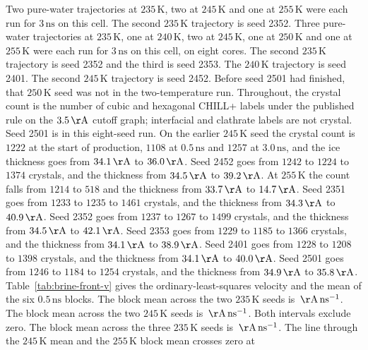 Two pure-water trajectories at $235\,\mathrm{K}$, two at
$245\,\mathrm{K}$ and one at $255\,\mathrm{K}$ were each run for
$3\,\mathrm{ns}$ on this cell.
The second $235\,\mathrm{K}$ trajectory is seed 2352.
Three pure-water trajectories at $235\,\mathrm{K}$, one at
$240\,\mathrm{K}$, two at $245\,\mathrm{K}$, one at
$250\,\mathrm{K}$ and one at $255\,\mathrm{K}$ were each run for
$3\,\mathrm{ns}$ on this cell, on eight cores.
The second $235\,\mathrm{K}$ trajectory is seed 2352 and the
third is seed 2353.
The $240\,\mathrm{K}$ trajectory is seed 2401.
The second $245\,\mathrm{K}$ trajectory is seed 2452.
Before seed 2501 had finished, that $250\,\mathrm{K}$ seed was not
in the two-temperature run.
Throughout, the crystal count is the number of cubic and hexagonal
CHILL+ labels under the published rule on the
$3.5\,\mathrm{\AA}$ cutoff graph; interfacial and clathrate labels are
not crystal.
Seed 2501 is in this eight-seed run.
On the earlier $245\,\mathrm{K}$ seed the crystal count is $1222$
at the start of production, $1108$ at $0.5\,\mathrm{ns}$ and $1257$
at $3.0\,\mathrm{ns}$, and the ice thickness goes from
$34.1\,\mathrm{\AA}$ to $36.0\,\mathrm{\AA}$.
Seed 2452 goes from $1242$ to $1224$ to $1374$ crystals, and the
thickness from $34.5\,\mathrm{\AA}$ to $39.2\,\mathrm{\AA}$.
At $255\,\mathrm{K}$ the count falls from $1214$ to $518$ and the
thickness from $33.7\,\mathrm{\AA}$ to $14.7\,\mathrm{\AA}$.
Seed 2351 goes from $1233$ to $1235$ to $1461$ crystals, and the
thickness from $34.3\,\mathrm{\AA}$ to $40.9\,\mathrm{\AA}$.
Seed 2352 goes from $1237$ to $1267$ to $1499$ crystals, and the
thickness from $34.5\,\mathrm{\AA}$ to $42.1\,\mathrm{\AA}$.
Seed 2353 goes from $1229$ to $1185$ to $1366$ crystals, and the
thickness from $34.1\,\mathrm{\AA}$ to $38.9\,\mathrm{\AA}$.
Seed 2401 goes from $1228$ to $1208$ to $1398$ crystals, and the
thickness from $34.1\,\mathrm{\AA}$ to $40.0\,\mathrm{\AA}$.
Seed 2501 goes from $1246$ to $1184$ to $1254$ crystals, and the
thickness from $34.9\,\mathrm{\AA}$ to $35.8\,\mathrm{\AA}$.
Table~\ref{tab:brine-front-v} gives the ordinary-least-squares
velocity and the mean of the six $0.5\,\mathrm{ns}$ blocks.
The block mean across the two $235\,\mathrm{K}$ seeds is
\GateMeanBlockTwo$\,\mathrm{\AA\,ns^{-1}}$.
The block mean across the two $245\,\mathrm{K}$ seeds is
\GateMeanBlockTwoFourFive$\,\mathrm{\AA\,ns^{-1}}$.
Both intervals exclude zero.
The block mean across the three $235\,\mathrm{K}$ seeds is
\GateMeanBlockThree$\,\mathrm{\AA\,ns^{-1}}$.
The line through the $245\,\mathrm{K}$ mean and the
$255\,\mathrm{K}$ block mean crosses zero at
